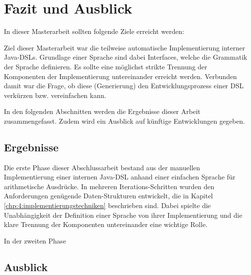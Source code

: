 
\chapter{Fazit und Ausblick}\label{chp:7:fazit}
In dieser Masterarbeit sollten folgende Ziele erreicht werden:

Ziel dieser Masterarbeit war die teilweise automatische Implementierung interner Java-DSLs. Grundlage einer Sprache sind dabei Interfaces, welche die Grammatik der Sprache definieren. Es sollte eine möglichst strikte Trennung der Komponenten der Implementierung untereinander erreicht werden. Verbunden damit war die Frage, ob diese (Generierung) den Entwicklungsprozess einer DSL verkürzen bzw. vereinfachen kann.

In den folgenden Abschnitten werden die Ergebnisse dieser Arbeit zusammengefasst. Zudem wird ein Ausblick auf künftige Entwicklungen gegeben.

\section{Ergebnisse}\label{sct:7.1:ergebnisse}
Die erste Phase dieser Abschlussarbeit bestand aus der manuellen Implementierung einer internen Java-DSL anhand einer einfachen Sprache für arithmetische Ausdrücke. In mehreren Iterations-Schritten wurden den Anforderungen genügende Daten-Strukturen entwickelt, die in Kapitel \ref{chp:4:implementierungstechniken} beschrieben sind.
Dabei spielte die Unabhängigkeit der Definition einer Sprache von ihrer Implementierung und die klare Trennung der Komponenten untereinander eine wichtige Rolle.

In der zweiten Phase 

\section{Ausblick}\label{sct:7.2:ausblick}